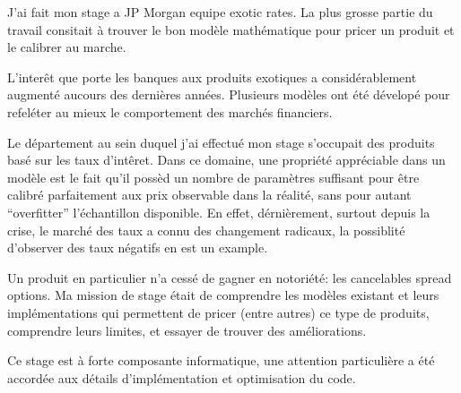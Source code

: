 J'ai fait mon stage a JP Morgan equipe exotic rates. La plus grosse partie du travail consitait à trouver le bon modèle mathématique pour pricer un produit et le calibrer au marche.

L'interêt que porte les banques aux produits exotiques a considérablement augmenté aucours des dernières années. Plusieurs modèles ont été dévelopé pour refeléter au mieux le comportement des marchés financiers.

Le département au sein duquel j'ai effectué mon stage s'occupait des produits basé sur les taux d'intêret. Dans ce domaine, une propriété appréciable dans un modèle est le fait qu'il possèd un nombre de paramètres suffisant pour être calibré parfaitement aux prix observable dans la réalité, sans pour autant ``overfitter'' l'échantillon disponible. En effet, dérnièrement, surtout depuis la crise, le marché des taux a connu des changement radicaux, la possiblité d'observer des taux négatifs en est un example. 

Un produit en particulier n'a cessé de  gagner en notoriété: les cancelables spread options. Ma mission de stage était de comprendre les modèles existant et leurs implémentations qui permettent de pricer (entre autres) ce type de produits, comprendre leurs limites, et essayer de trouver des améliorations.

Ce stage est à forte composante informatique, une attention particulière a été accordée aux détails d'implémentation et optimisation du code.
